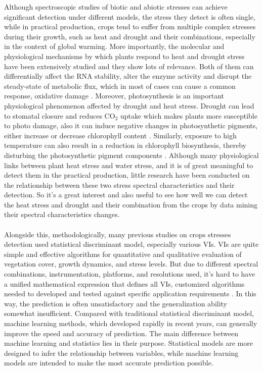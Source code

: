 \documentclass[12pt,a4paper]{article}
\begin{document}
Although spectroscopic studies of biotic and abiotic stresses can achieve significant detection under different models, the stress they detect is often single, while in practical production, crops tend to suffer from multiple complex stresses during their growth, such as heat and drought and their combinations, especially in the context of global warming. More importantly, the molecular and physiological mechanisms by which plants respond to heat and drought stress have been extensively studied and they show lots of relevance. Both of them can differentially affect the RNA stability, alter the enzyme activity and disrupt the steady-state of metabolic flux, which in most of cases can cause a common response, oxidative damage \citep{kollist2018rapid,suzuki2012ros, mittler2012plants,mcclung2010ambient}. Moreover, photosynthesis is an important physiological phenomenon affected by drought and heat stress. Drought can lead to stomatal closure and reduces CO$_2$ uptake which makes plants more susceptible to photo damage, also it can induce negative changes in photosynthetic pigments, either increase or decrease chlorophyll content \citep{lawlor2002photosynthetic,anjum2011brassinolide,din2011physiological}. Similarly, exposure to high temperature can also result in a reduction in chlorophyll biosynthesis, thereby disturbing the photosynthetic pigment components \citep{camejo2006changes}. Although many physiological links between plant heat stress and water stress, and it is of great meaningful to detect them in the practical production, little research have been conducted on the relationship between these two stress spectral characteristics and their detection. So it's a great interest and also useful to see how well we can detect the heat stress and drought and their combination from the crops by data mining their spectral characteristics changes.
\\
\\
Alongside this, methodologically, many previous studies on crops stresses detection used statistical discriminant model, especially various VIs. VIs are quite simple and effective algorithms for quantitative and qualitative evaluation of vegetation cover, growth dynamics, and stress levels. But due to different spectral combinations, instrumentation, platforms, and resolutions used, it's hard to have a unified mathematical expression that defines all VIs, customized algorithms needed to developed and tested against specific application requirements \citep{xue2017significant}. In this way, the prediction is often unsatisfactory and the generalization ability somewhat insufficient. Compared with traditional statistical discriminant model, machine learning methods, which developed rapidly in recent years, can generally improve the speed and accuracy of prediction. The main difference between machine learning and statistics lies in their purpose. Statistical models are more designed to infer the relationship between variables, while machine learning models are intended to make the most accurate prediction possible. 
\end{document}
